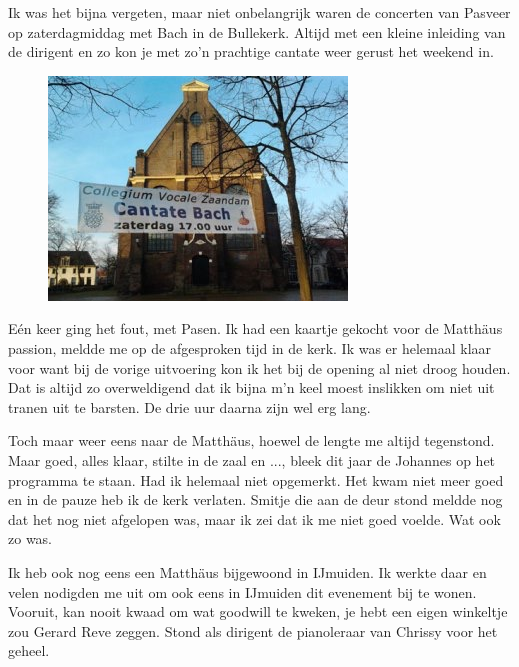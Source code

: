 \documentclass[12pt,twoside, openright]{memoir}
\begin{document}
Ik was het bijna vergeten, maar niet onbelangrijk waren de concerten van Pasveer op zaterdagmiddag met Bach in de Bullekerk. Altijd met een kleine inleiding van de dirigent en zo kon je met zo’n prachtige cantate weer gerust het weekend in.

\begin{figure}
\includegraphics[width=\textwidth]{img/ch31/Spandoek-cantate-klein}
\end{figure}

Eén keer ging het fout, met Pasen. Ik had een kaartje gekocht voor de Matthäus passion, meldde me op de afgesproken tijd in de kerk. Ik was er helemaal klaar voor want bij de vorige uitvoering kon ik het bij de opening al niet droog houden. Dat is altijd zo overweldigend dat ik bijna m’n keel moest inslikken om niet uit tranen uit te barsten. De drie uur daarna zijn wel erg lang. 

Toch maar weer eens naar de Matthäus, hoewel de lengte me altijd tegenstond. Maar goed, alles klaar, stilte in de zaal en ..., bleek dit jaar de Johannes op het programma te staan. Had ik helemaal niet opgemerkt. Het kwam niet meer goed en in de pauze heb ik de kerk verlaten. Smitje die aan de deur stond meldde nog dat het nog niet afgelopen was, maar ik zei dat ik me niet goed voelde. Wat ook zo was.


Ik heb ook nog eens een Matthäus bijgewoond in IJmuiden. Ik werkte daar en velen nodigden me uit om ook eens in IJmuiden dit evenement bij te wonen. Vooruit, kan nooit kwaad om wat goodwill te kweken, je hebt een eigen winkeltje zou Gerard Reve zeggen. Stond als dirigent de pianoleraar van Chrissy voor het geheel. 
\end{document}
